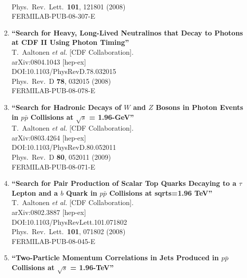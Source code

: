 \documentclass{article}
\begin{document}
\begin{enumerate}
  \\{}Phys.\ Rev.\ Lett.\  {\bf 101}, 121801 (2008)
  \\{}FERMILAB-PUB-08-307-E
\item%
{\bf ``Search for Heavy, Long-Lived Neutralinos that Decay to Photons at CDF II Using Photon Timing''}
  \\{}T.~Aaltonen {\it et al.} [CDF Collaboration].
  \\{}arXiv:0804.1043 [hep-ex]
  \\{}DOI:10.1103/PhysRevD.78.032015
  \\{}Phys.\ Rev.\ D {\bf 78}, 032015 (2008)
  \\{}FERMILAB-PUB-08-078-E
\item%
{\bf ``Search for Hadronic Decays of $W$ and $Z$ Bosons in Photon Events in $p \bar{p}$ Collisions at $\sqrt{s}$ = 1.96-GeV''}
  \\{}T.~Aaltonen {\it et al.} [CDF Collaboration].
  \\{}arXiv:0803.4264 [hep-ex]
  \\{}DOI:10.1103/PhysRevD.80.052011
  \\{}Phys.\ Rev.\ D {\bf 80}, 052011 (2009)
  \\{}FERMILAB-PUB-08-071-E
\item%
{\bf ``Search for Pair Production of Scalar Top Quarks Decaying to a $\tau$ Lepton and a $b$ Quark in $p\bar{p}$ Collisions at sqrt{s}=1.96 TeV''}
  \\{}T.~Aaltonen {\it et al.} [CDF Collaboration].
  \\{}arXiv:0802.3887 [hep-ex]
  \\{}DOI:10.1103/PhysRevLett.101.071802
  \\{}Phys.\ Rev.\ Lett.\  {\bf 101}, 071802 (2008)
  \\{}FERMILAB-PUB-08-045-E
\item%
{\bf ``Two-Particle Momentum Correlations in Jets Produced in $p\bar{p}$ Collisions at $\sqrt{s}$ = 1.96-TeV''}

\end{enumerate}
\end{document}
